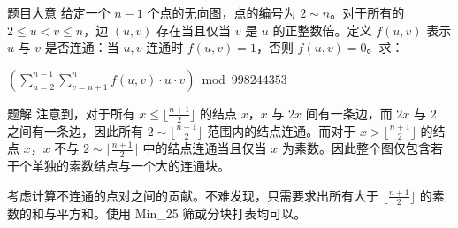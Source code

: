 \begin{frame}{题目大意}
	给定一个 $n - 1$ 个点的无向图，点的编号为 $2 \sim n$。对于所有的 $2 \le u < v \le n$，边 $(u, v)$ 存在当且仅当 $v$ 是 $u$ 的正整数倍。定义 $f(u, v)$ 表示 $u$ 与 $v$ 是否连通：当 $u, v$ 连通时 $f(u, v) = 1$，否则 $f(u, v) = 0$。求：

	$\left(\sum_{u = 2} ^ {n - 1} \sum_{v = u + 1} ^ n f(u, v) \cdot u \cdot v\right) \bmod {998244353}$

\end{frame}

\begin{frame}{题解}
注意到，对于所有 $x \le \lfloor \frac{n + 1}{2} \rfloor$ 的结点 $x$，$x$ 与 $2x$ 间有一条边，而 $2x$ 与 $2$ 之间有一条边，因此所有 $2 \sim \lfloor \frac{n + 1}{2} \rfloor$ 范围内的结点连通。而对于 $x > \lfloor \frac{n + 1}{2} \rfloor$ 的结点 $x$，$x$ 不与 $2 \sim \lfloor \frac{n + 1}{2} \rfloor$ 中的结点连通当且仅当 $x$ 为素数。因此整个图仅包含若干个单独的素数结点与一个大的连通块。\pause

考虑计算不连通的点对之间的贡献。不难发现，只需要求出所有大于 $ \lfloor \frac{n + 1}{2} \rfloor$ 的素数的和与平方和。使用 Min\_25 筛或分块打表均可以。

\end{frame}
